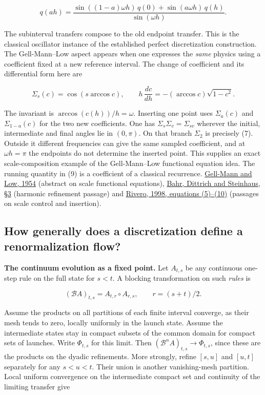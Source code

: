 \documentclass[11pt,a4paper]{article}
\begin{document}
\[
 q(ah)=\frac{\sin((1-a)\omega h)\,q(0)+\sin(a\omega h)\,q(h)}
                 {\sin(\omega h)}.                                  \tag{8}
\]

The subinterval transfers compose to the old endpoint transfer. This is
the classical oscillator instance of the established perfect
discretization construction. The Gell-Mann--Low aspect appears when one
expresses the \emph{same} physics using a coefficient fixed at a new
reference interval. The change of coefficient and its differential form
here are

\[
 \Sigma_s(c)=\cos(s\arccos c),\qquad
 h\,\frac{dc}{dh}=-(\arccos c)\sqrt{1-c^2}.                         \tag{9}
\]

The invariant is \(\arccos(c(h))/h=\omega\). Inserting one point uses
\(\Sigma_a(c)\) and \(\Sigma_{1-a}(c)\) for the two new coefficients.
One has \(\Sigma_s\Sigma_v=\Sigma_{sv}\) wherever the initial,
intermediate and final angles lie in \((0,\pi)\). On that branch
\(\Sigma_2\) is precisely (7). Outside it different frequencies can give
the same sampled coefficient, and at \(\omega h=\pi\) the endpoints do
not determine the inserted point. This supplies an exact
scale-composition example of the Gell-Mann--Low functional equation
idea. The running quantity in (9) is a coefficient of a classical
recurrence. \href{https://doi.org/10.1103/PhysRev.95.1300}{Gell-Mann and
Low, 1954} (abstract on scale functional equations),
\href{https://arxiv.org/pdf/1101.4775}{Bahr, Dittrich and Steinhaus, §3}
(harmonic refinement passage) and
\href{https://arxiv.org/pdf/quant-ph/9803035}{Rivero, 1998, equations
(5)--(10)} (passages on scale control and insertion).

\subsection{How generally does a discretization define a renormalization
flow?}\label{how-generally-does-a-discretization-define-a-renormalization-flow}

\textbf{The continuum evolution as a fixed point.} Let \(A_{t,s}\) be
any continuous one-step rule on the full state for \(s<t\). A blocking
transformation on such \emph{rules} is

\[
 (\mathcal B A)_{t,s}=A_{t,r}\circ A_{r,s},\qquad r=(s+t)/2.
\]

Assume the products on all partitions of each finite interval converge,
as their mesh tends to zero, locally uniformly in the launch state.
Assume the intermediate states stay in compact subsets of the common
domain for compact sets of launches. Write \(\Phi_{t,s}\) for this
limit. Then \((\mathcal B^n A)_{t,s}\to\Phi_{t,s}\), since these are the
products on the dyadic refinements. More strongly, refine \([s,u]\) and
\([u,t]\) separately for any \(s<u<t\). Their union is another
vanishing-mesh partition. Local uniform convergence on the intermediate
compact set and continuity of the limiting transfer give
\end{document}
